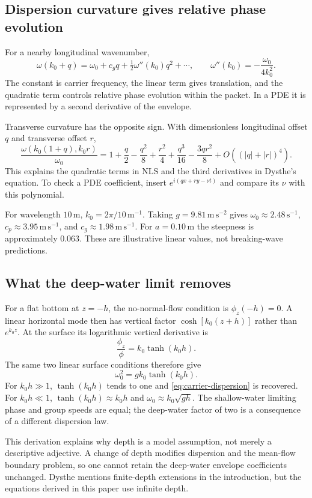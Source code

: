 \subsection{Dispersion curvature gives relative phase evolution}
For a nearby longitudinal wavenumber,
\[
 \omega(k_0+q)=\omega_0+c_gq+\tfrac12\omega''(k_0)q^2+\cdots,
 \qquad \omega''(k_0)=-\frac{\omega_0}{4k_0^2}.
\]
The constant is carrier frequency, the linear term gives translation, and
the quadratic term controls relative phase evolution within the packet.
In a PDE it is represented by a second derivative of the envelope.

Transverse curvature has the opposite sign. With dimensionless longitudinal
offset $q$ and transverse offset $r$,
\begin{equation}\label{eq:dispersion-series}
 \frac{\omega(k_0(1+q),k_0r)}{\omega_0}
 =1+\frac q2-\frac{q^2}{8}+\frac{r^2}{4}
 +\frac{q^3}{16}-\frac{3qr^2}{8}+O((|q|+|r|)^4).
\end{equation}
This explains the quadratic terms in NLS and the third derivatives in
Dysthe's equation. To check a PDE coefficient, insert
$e^{i(qx+ry-\nu t)}$ and compare its $\nu$ with this polynomial.

\begin{example}
For wavelength $10\,\mathrm{m}$, $k_0=2\pi/10\,\mathrm{m}^{-1}$.
Taking $g=9.81\,\mathrm{m\,s}^{-2}$ gives
$\omega_0\approx2.48\,\mathrm{s}^{-1}$,
$c_p\approx3.95\,\mathrm{m\,s}^{-1}$, and
$c_g\approx1.98\,\mathrm{m\,s}^{-1}$.
For $a=0.10\,\mathrm{m}$ the steepness is approximately $0.063$.
These are illustrative linear values, not breaking-wave predictions.
\end{example}

\subsection{What the deep-water limit removes}
For a flat bottom at $z=-h$, the no-normal-flow condition is
$\phi_z(-h)=0$. A linear horizontal mode then has vertical factor
$\cosh[k_0(z+h)]$ rather than $e^{k_0z}$. At the surface its logarithmic
vertical derivative is
\[
 \frac{\phi_z}{\phi}=k_0\tanh(k_0h).
\]
The same two linear surface conditions therefore give
\[
 \omega_0^2=gk_0\tanh(k_0h).
\]
For $k_0h\gg1$, $\tanh(k_0h)$ tends to one and
\eqref{eq:carrier-dispersion} is recovered. For $k_0h\ll1$,
$\tanh(k_0h)\approx k_0h$ and $\omega_0\approx k_0\sqrt{gh}$.
The shallow-water limiting phase and group speeds are equal; the deep-water
factor of two is a consequence of a different dispersion law.

This derivation explains why depth is a model assumption, not merely a
descriptive adjective. A change of depth modifies dispersion and the
mean-flow boundary problem, so one cannot retain the deep-water envelope
coefficients unchanged. Dysthe mentions finite-depth extensions in the
introduction, but the equations derived in this paper use infinite depth.

\clearpage
